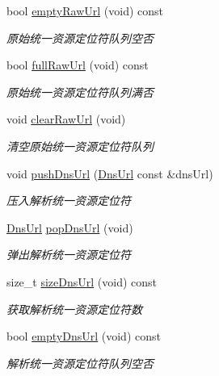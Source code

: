 \begin{DoxyCompactItemize}
bool \hyperlink{class_url_queues_af01992d66f4979e74e5c6661c76cbc1a}{empty\+Raw\+Url} (void) const
\begin{DoxyCompactList}\small\item\em 原始统一资源定位符队列空否 \end{DoxyCompactList}\item 
bool \hyperlink{class_url_queues_aaf6b48955b4ab667301188c48265506e}{full\+Raw\+Url} (void) const
\begin{DoxyCompactList}\small\item\em 原始统一资源定位符队列满否 \end{DoxyCompactList}\item 
\mbox{\label{class_url_queues_a0b751864e21212cd2f8d8bf7b707507b}} 
void \hyperlink{class_url_queues_a0b751864e21212cd2f8d8bf7b707507b}{clear\+Raw\+Url} (void)
\begin{DoxyCompactList}\small\item\em 清空原始统一资源定位符队列 \end{DoxyCompactList}\item 
void \hyperlink{class_url_queues_a4c7902b3c7ddd5c9758dbd0e5085ad18}{push\+Dns\+Url} (\hyperlink{class_dns_url}{Dns\+Url} const \&dns\+Url)
\begin{DoxyCompactList}\small\item\em 压入解析统一资源定位符 \end{DoxyCompactList}\item 
\hyperlink{class_dns_url}{Dns\+Url} \hyperlink{class_url_queues_ae42bc6d47ae51b0c02a0360f05bf0770}{pop\+Dns\+Url} (void)
\begin{DoxyCompactList}\small\item\em 弹出解析统一资源定位符 \end{DoxyCompactList}\item 
size\+\_\+t \hyperlink{class_url_queues_a65b094e4cd9f54ce9019b4045dd0e6da}{size\+Dns\+Url} (void) const
\begin{DoxyCompactList}\small\item\em 获取解析统一资源定位符数 \end{DoxyCompactList}\item 
bool \hyperlink{class_url_queues_adde4a7863750a113ba7e4da686bbf93c}{empty\+Dns\+Url} (void) const
\begin{DoxyCompactList}\small\item\em 解析统一资源定位符队列空否 \end{DoxyCompactList}\item 

\end{DoxyCompactItemize}
